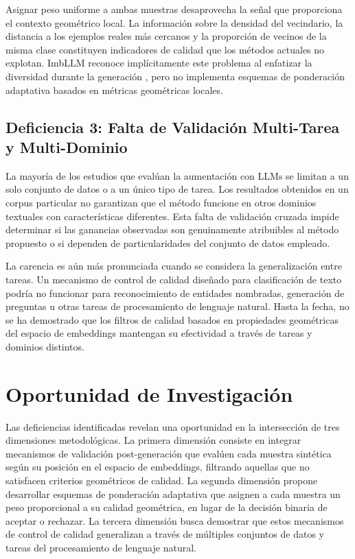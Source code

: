 Asignar peso uniforme a ambas muestras desaprovecha la señal que proporciona el contexto geométrico local. La información sobre la densidad del vecindario, la distancia a los ejemplos reales más cercanos y la proporción de vecinos de la misma clase constituyen indicadores de calidad que los métodos actuales no explotan. ImbLLM reconoce implícitamente este problema al enfatizar la diversidad durante la generación \cite{imbllm2024arxiv}, pero no implementa esquemas de ponderación adaptativa basados en métricas geométricas locales.

\subsection{Deficiencia 3: Falta de Validación Multi-Tarea y Multi-Dominio}

La mayoría de los estudios que evalúan la aumentación con LLMs se limitan a un solo conjunto de datos o a un único tipo de tarea. Los resultados obtenidos en un corpus particular no garantizan que el método funcione en otros dominios textuales con características diferentes. Esta falta de validación cruzada impide determinar si las ganancias observadas son genuinamente atribuibles al método propuesto o si dependen de particularidades del conjunto de datos empleado.

La carencia es aún más pronunciada cuando se considera la generalización entre tareas. Un mecanismo de control de calidad diseñado para clasificación de texto podría no funcionar para reconocimiento de entidades nombradas, generación de preguntas u otras tareas de procesamiento de lenguaje natural. Hasta la fecha, no se ha demostrado que los filtros de calidad basados en propiedades geométricas del espacio de embeddings mantengan su efectividad a través de tareas y dominios distintos.

\section{Oportunidad de Investigación}

Las deficiencias identificadas revelan una oportunidad en la intersección de tres dimensiones metodológicas. La primera dimensión consiste en integrar mecanismos de validación post-generación que evalúen cada muestra sintética según su posición en el espacio de embeddings, filtrando aquellas que no satisfacen criterios geométricos de calidad. La segunda dimensión propone desarrollar esquemas de ponderación adaptativa que asignen a cada muestra un peso proporcional a su calidad geométrica, en lugar de la decisión binaria de aceptar o rechazar. La tercera dimensión busca demostrar que estos mecanismos de control de calidad generalizan a través de múltiples conjuntos de datos y tareas del procesamiento de lenguaje natural.


